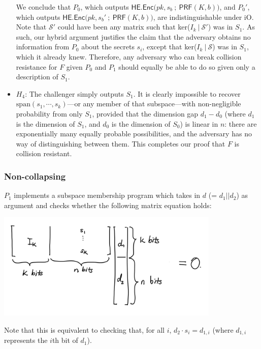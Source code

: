 \documentclass{article}
\begin{document}
\begin{itemize}
    We conclude that $P_0$, which outputs $\textsf{HE.Enc}\big( pk, s_b \:;\: \textsf{PRF}(K, b) \big)$, and $P_0'$, which outputs  $\textsf{HE.Enc}\big( pk, s_b' \:;\: \textsf{PRF}(K, b) \big)$, are indistinguishable under \textsf{iO}. Note that $\mathcal{S}'$ could have been any matrix such that ker($I_k \: | \: \mathcal{S}'$) was in $S_1$. As such, our hybrid argument justifies the claim that the adversary obtains no information from $P_0$ about the secrets $s_i$, except that ker($I_k \: | \: \mathcal{S}$) was in $S_1$, which it already knew. Therefore, any adversary who can break collision resistance for $F$ given $P_0$ and $P_1$ should equally be able to do so given only a description of $S_1$.
    \item $H_4$: The challenger simply outputs $S_1$. It is clearly impossible to recover $\mathrm{span}(s_1, \cdots, s_k)$---or any member of that subspace---with non-negligible probability from only $S_1$, provided that the dimension gap $d_1 - d_0$ (where $d_1$ is the dimension of $S_1$, and $d_0$ is the dimension of $S_0$) is linear in $n$: there are exponentially many equally probable possibilities, and the adversary has no way of distinguishing between them. This completes our proof that $F$ is collision resistant.
\end{itemize}

\subsubsection{Non-collapsing}
$P_1$ implements a subspace membership program which takes in $d$ (= $d_1 || d_2$) as argument and checks whether the following matrix equation holds:
\begin{center}
\includegraphics[width=0.8\textwidth]{Diagrams/1.png}
\end{center}

Note that this is equivalent to checking that, for all $i$, $d_2 \cdot s_i = d_{1, i}$ (where $d_{1, i}$ represents the $i$th bit of $d_1$).
\end{document}
